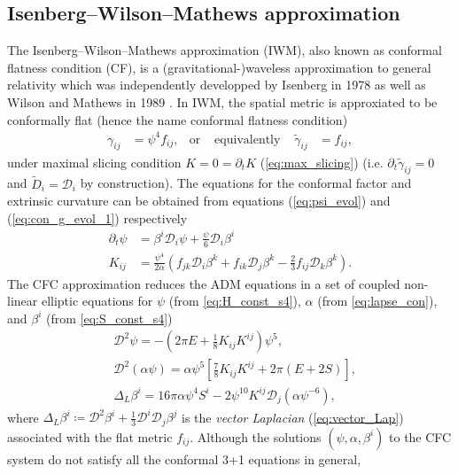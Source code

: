 \subsection{Isenberg–Wilson–Mathews approximation}  %
\label{section1.5.1}
The Isenberg–Wilson–Mathews approximation (IWM), also known as conformal flatness condition (CF),
is a (gravitational-)waveless approximation to general relativity which was independently developped by
Isenberg in 1978 \cite{isenberg2008waveless} as well as Wilson and Mathews in 1989 \cite{wilson1989relativistic}.
In IWM, the spatial metric is approxiated to be conformally flat (hence the name conformal flatness condition)
\begin{align}
    \gamma_{ij} &= \psi^4 f_{ij}, &\text{or } &\text{equivalently } & \tilde{\gamma}_{ij} &= f_{ij},
\end{align}
under maximal slicing condition $K=0=\partial_t K$ (\cref{eq:max_slicing})
(i.e. $\partial_t \tilde{\gamma}_{ij} = 0$ and $\tilde{D}_i=\mathcal{D}_i$ by construction).
The equations for the conformal factor and extrinsic curvature can be obtained from equations (\ref{eq:psi_evol}) and (\ref{eq:con_g_evol_1}) respectively
\begin{align}
    \partial_t \psi &= \beta^i \mathcal{D}_i \psi + \frac{\psi}{6} \mathcal{D}_i \beta^i \\
    K_{ij} &= \frac{\psi^4}{2\alpha} \left(f_{jk} \mathcal{D}_i \beta^k + f_{ik} \mathcal{D}_j \beta^k - \frac{2}{3} f_{ij} \mathcal{D}_k \beta^k \right) 
    \label{eq:K_CFC}.
\end{align}
The CFC approximation reduces the ADM equations in a set of coupled non-linear elliptic equations for $\psi$ (from \cref{eq:H_const_s4}), $\alpha$ (from \cref{eq:lapse_con}), and $\beta^i$ (from \cref{eq:S_const_s4})
\begin{align}
    & \mathcal{D}^2 \psi = - \left( 2\pi E + \frac{1}{8}K_{ij} K^{ij} \right) \psi^5, \\
    & \mathcal{D}^2 \left(\alpha \psi \right) = \alpha \psi^5 \left[ \frac{7}{8} K_{ij} K^{ij} + 2 \pi \left(E + 2 S \right) \right], \\
    & \Delta_L \beta^i = 16 \pi \alpha \psi^4 S^i - 2 \psi^{10} K^{ij} \mathcal{D}_j \left(\alpha \psi^{-6} \right),
\end{align}
where $\Delta_L \beta^i \coloneqq \mathcal{D}^2 \beta^i + \frac{1}{3} \mathcal{D}^i \mathcal{D}_j \beta^j$
is the \textit{vector Laplacian} (\cref{eq:vector_Lap}) associated with the flat metric $f_{ij}$.
Although the solutions $(\psi, \alpha, \beta^i)$ to the CFC system do not satisfy all the conformal 3+1 equations in general,
